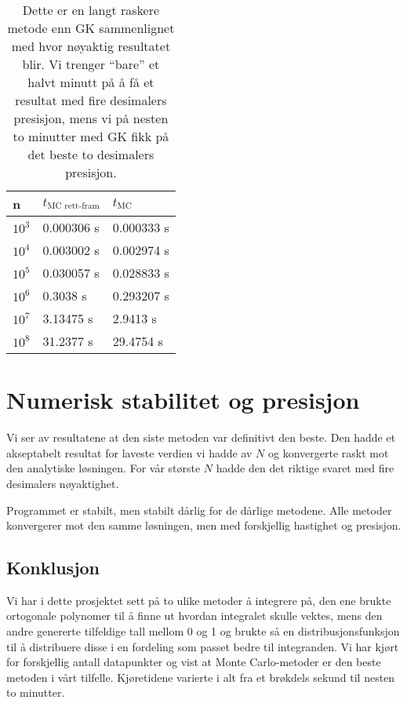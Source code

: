 \documentclass[norsk, 10pt,twocolumn]{article}
\begin{document}
\begin{table}[H]
  \centering
  \begin{tabular}{ l l l}
    \toprule
	n & $t_{\text{MC rett-fram}}$ & $t_{\text{MC}}$ \\
	\midrule
	$10^3$ & 0.000306 s & 0.000333 s \\
	$10^4$ & 0.003002 s & 0.002974 s \\
	$10^5$ & 0.030057 s & 0.028833 s \\
	$10^6$ & 0.3038 s & 0.293207 s \\
	$10^7$ & 3.13475 s & 2.9413 s \\
	$10^8$ & 31.2377 s & 29.4754 s \\
	\bottomrule
  \end{tabular}
  \caption{Dette er en langt raskere metode enn GK sammenlignet med hvor nøyaktig resultatet blir. Vi trenger ``bare'' et halvt minutt på å få et resultat med fire desimalers presisjon, mens vi på nesten to minutter med GK fikk på det beste to desimalers presisjon.}
  \label{tab:tid_MC}
\end{table}

\section*{Numerisk stabilitet og presisjon}
Vi ser av resultatene at den siste metoden var definitivt den beste. Den hadde et akseptabelt resultat for laveste verdien vi hadde av $N$ og konvergerte raskt mot den analytiske løsningen. For vår største $N$ hadde den det riktige svaret med fire desimalers nøyaktighet.

Programmet er stabilt, men stabilt dårlig for de dårlige metodene. Alle metoder konvergerer mot den samme løsningen, men med forskjellig hastighet og presisjon.

\subsection*{Konklusjon}
Vi har i dette prosjektet sett på to ulike metoder å integrere på, den ene brukte ortogonale polynomer til å finne ut hvordan integralet skulle vektes, mens den andre genererte tilfeldige tall mellom 0 og 1 og brukte så en distribusjonsfunksjon til å distribuere disse i en fordeling som passet bedre til integranden. Vi har kjørt for forskjellig antall datapunkter og vist at Monte Carlo-metoder er den beste metoden i vårt tilfelle. Kjøretidene varierte i alt fra et brøkdels sekund til nesten to minutter.
\end{document}
